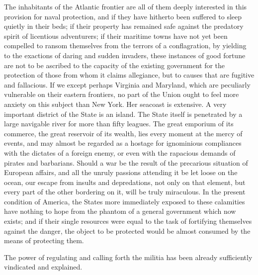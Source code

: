 The inhabitants of the Atlantic frontier are all of them deeply interested in this provision for naval protection, and if they have hitherto been suffered to sleep quietly in their beds; if their property has remained safe against the predatory spirit of licentious adventurers; if their maritime towns have not yet been compelled to ransom themselves from the terrors of a conflagration, by yielding to the exactions of daring and sudden invaders, these instances of good fortune are not to be ascribed to the capacity of the existing government for the protection of those from whom it claims allegiance, but to causes that are fugitive and fallacious. 
If we except perhaps Virginia and Maryland, which are peculiarly vulnerable on their eastern frontiers, no part of the Union ought to feel more anxiety on this subject than New York. 
Her seacoast is extensive. 
A very important district of the State is an island. 
The State itself is penetrated by a large navigable river for more than fifty leagues. 
The great emporium of its commerce, the great reservoir of its wealth, lies every moment at the mercy of events, and may almost be regarded as a hostage for ignominious compliances with the dictates of a foreign enemy, or even with the rapacious demands of pirates and barbarians. 
Should a war be the result of the precarious situation of European affairs, and all the unruly passions attending it be let loose on the ocean, our escape from insults and depredations, not only on that element, but every part of the other bordering on it, will be truly miraculous. 
In the present condition of America, the States more immediately exposed to these calamities have nothing to hope from the phantom of a general government which now exists; and if their single resources were equal to the task of fortifying themselves against the danger, the object to be protected would be almost consumed by the means of protecting them.

The power of regulating and calling forth the militia has been already sufficiently vindicated and explained.

